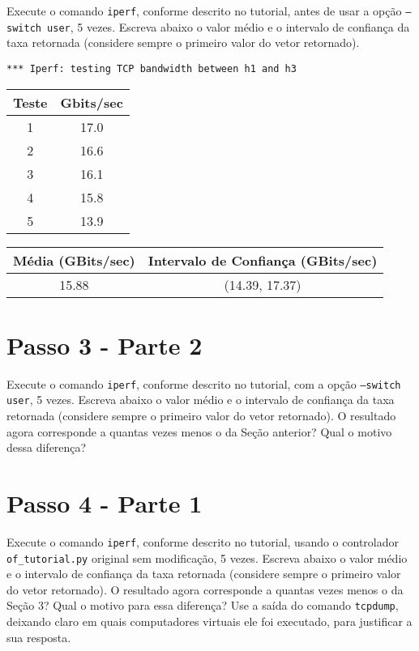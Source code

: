 \documentclass[12pt,letterpaper]{article}
\begin{document}
Execute o comando \texttt{iperf}, conforme descrito no tutorial, antes
de usar a opção \texttt{--switch user}, 5 vezes.  Escreva abaixo o
valor médio e o intervalo de confiança da taxa retornada (considere
sempre o primeiro valor do vetor retornado).

\begin{verbatim}
*** Iperf: testing TCP bandwidth between h1 and h3
\end{verbatim}

\begin{center}
\begin{tabular}{ |c|c| } 
 \hline
 Teste & Gbits/sec \\
 \hline
 1 & 17.0 \\ 
 2 & 16.6 \\ 
 3 & 16.1 \\ 
 4 & 15.8 \\ 
 5 & 13.9 \\ 
 \hline
\end{tabular}
\end{center}

\begin{center}
\begin{tabular}{|c|c|}
 \hline
 Média (GBits/sec) & Intervalo de Confiança (GBits/sec)\\
 \hline
 15.88 & (14.39, 17.37) \\
 \hline
 \end{tabular}
\end{center}


\section{Passo 3 - Parte 2}


Execute o comando \texttt{iperf}, conforme descrito no tutorial, com a
opção \texttt{--switch user}, 5 vezes. Escreva abaixo o valor médio e
o intervalo de confiança da taxa retornada (considere sempre o
primeiro valor do vetor retornado). O resultado agora corresponde a
quantas vezes menos o da Seção anterior? Qual o motivo dessa
diferença?


\section{Passo 4 - Parte 1}


Execute o comando \texttt{iperf}, conforme descrito no tutorial,
usando o controlador \texttt{of\_tutorial.py} original sem
modificação, 5 vezes. Escreva abaixo o valor médio e o intervalo de
confiança da taxa retornada (considere sempre o primeiro valor do
vetor retornado). O resultado agora corresponde a quantas vezes menos
o da Seção 3? Qual o motivo para essa diferença? Use a saída do
comando \texttt{tcpdump}, deixando claro em quais computadores
virtuais ele foi executado, para justificar a sua resposta.
\end{document}
